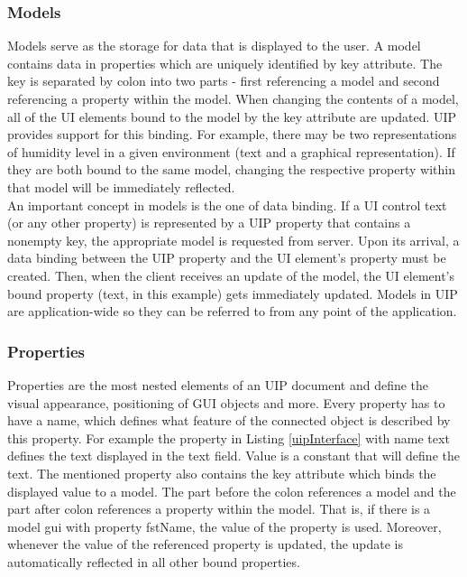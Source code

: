 \subsubsection{Models}
Models serve as the storage for data that is displayed to the user. A model contains data in properties which are uniquely identified by key attribute. The key is separated by colon into two parts - first referencing a model and second referencing a property within the model. When changing the contents of a model, all of the UI elements bound to the model by the key attribute are updated. UIP provides support for this binding. For example, there may be two representations of humidity level in a given environment (text and a graphical representation). If they are both bound to the same model, changing the respective property within that model will be immediately reflected.\\
An important concept in models is the one of data binding. If a UI control text (or any other property) is represented by a UIP property that contains a nonempty key, the appropriate model is requested from server. Upon its arrival, a data binding between the UIP property and the UI element's property must be created. Then, when the client receives an update of the model, the UI element's bound property (text, in this example) gets immediately updated. Models in UIP are application-wide so they can be referred to from any point of the application.

\subsubsection{Properties}
Properties are the most nested elements of an UIP document and define the visual appearance, positioning of GUI objects and more. Every property has to have a name, which defines what feature of the connected object is described by this property. For example the property in Listing \ref{uipInterface} with name text defines the text displayed in the text field. Value is a constant that will define the text. The mentioned property also contains the key attribute which binds the displayed value to a model. The part before the colon references a model and the part after colon references a property within the model. That is, if there is a model gui with property fstName, the value of the property is used. Moreover, whenever the value of the referenced property is updated, the update is automatically reflected in all other bound properties.



\endinput